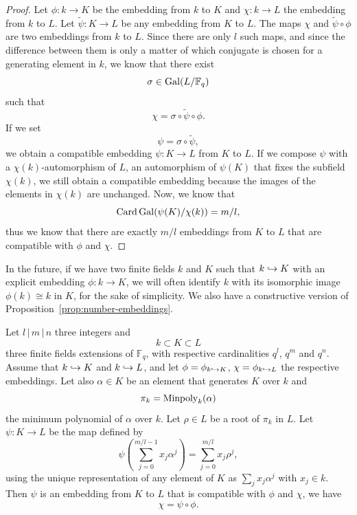   \begin{proof}
    Let $\phi:k\to K$ be the embedding from $k$ to $K$ and $\chi:k\to L$ the
    embedding from $k$ to $L$. Let $\widetilde\psi:K\to L$ be any embedding from $K$ to
    $L$. The maps $\chi$ and $\widetilde\psi\circ\phi$ are two embeddings from
    $k$ to $L$. Since there are only $l$ such maps, and since the difference
    between them is only a matter of which conjugate is chosen for a generating
    element in $k$, we know that there exist
    \[
      \sigma\in\operatorname{Gal}(L/\mathbb{F}_q)
    \]
    such that
    \[
      \chi = \sigma\circ\widetilde\psi\circ\phi.
    \]
    If we set
    \[
      \psi=\sigma\circ\widetilde\psi,
    \]
    we obtain a compatible embedding $\psi:K\to L$ from $K$ to $L$. If we
    compose $\psi$ with a $\chi(k)$-automorphism of $L$, \ie an automorphism of
    $\psi(K)$ that
    fixes the subfield $\chi(k)$, we still obtain a compatible embedding because
    the images of the elements in $\chi(k)$ are unchanged. Now, we know that
    \[
      \operatorname{Card}\operatorname{Gal}(\psi(K)/\chi(k)) = m/l,
    \]
    thus we know that there are exactly $m/l$ embeddings from $K$ to $L$ that
    are compatible with $\phi$ and $\chi$.
  \end{proof}
  In the future, if we have two finite fields $k$ and $K$ such that $k\hookrightarrow K$
  with an explicit embedding $\phi:k\to K$, we will often identify $k$ with
  its isomorphic image $\phi(k)\cong k$ in $K$, for the sake of simplicity. We
  also have a constructive version of Proposition~\ref{prop:number-embeddings}.
\begin{prop}
    \label{prop:number-embeddings-constructive}
    Let $l\,|\,m\,|\,n$ three integers and
    \[
      k\subset K\subset L
    \]
    three finite fields extensions of $\mathbb{F}_q$, with respective
    cardinalities $q^l$, $q^m$ and $q^n$. Assume that $k\hookrightarrow K$ and $k\hookrightarrow L$,
    and let $\phi=\phi_{k\hookrightarrow K}$, $\chi=\phi_{k\hookrightarrow L}$ the respective embeddings.
    Let also $\alpha\in K$ be an element that generates $K$ over $k$ and
    \[
      \pi_k=\operatorname{Minpoly}_k(\alpha)
    \]
    the minimum polynomial of $\alpha$ over $k$. Let $\rho\in L$ be a root of
    $\pi_k$ in $L$. Let $\psi:K\to L$ be the map defined by
    \[
      \psi(\sum_{j=0}^{m/l-1}x_j\alpha^j) = \sum_{j=0}^{m/l}x_j\rho^j,
    \]
    using the unique representation of any element of $K$ as $\sum_j x_j
    \alpha^j$ with $x_j\in k$. Then $\psi$ is an embedding from $K$ to $L$ that
    is compatible with $\phi$ and $\chi$, \ie we have
    \[
      \chi = \psi\circ\phi.
    \]
  \end{prop}
